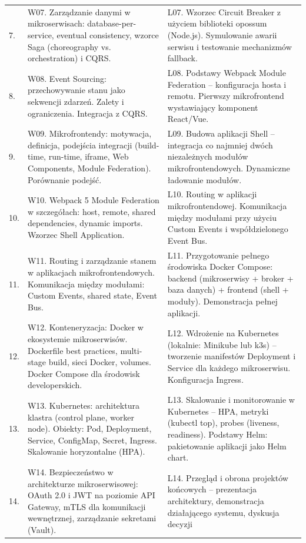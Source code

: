\documentclass[12pt, a4paper]{article}
\begin{document}
{\begin{longtable}{m{1.5cm}m{6.5cm}m{6.5cm}}
  \rowcolor{tableRowLight} 7. & W07. Zarządzanie danymi w mikroserwisach: database-per-service, eventual consistency, wzorce Saga (choreography vs. orchestration) i CQRS. & L07. Wzorzec Circuit Breaker z użyciem biblioteki opossum (Node.js). Symulowanie awarii serwisu i testowanie mechanizmów fallback. \\
  \rowcolor{tableRowAlt} 8. & W08. Event Sourcing: przechowywanie stanu jako sekwencji zdarzeń. Zalety i ograniczenia. Integracja z CQRS. & L08. Podstawy Webpack Module Federation – konfiguracja hosta i remotu. Pierwszy mikrofrontend wystawiający komponent React/Vue. \\
  \rowcolor{tableRowLight} 9. & W09. Mikrofrontendy: motywacja, definicja, podejścia integracji (build-time, run-time, iframe, Web Components, Module Federation). Porównanie podejść. & L09. Budowa aplikacji Shell – integracja co najmniej dwóch niezależnych modułów mikrofrontendowych. Dynamiczne ładowanie modułów. \\
  \rowcolor{tableRowAlt} 10. & W10. Webpack 5 Module Federation w szczegółach: host, remote, shared dependencies, dynamic imports. Wzorzec Shell Application. & L10. Routing w aplikacji mikrofrontendowej. Komunikacja między modułami przy użyciu Custom Events i współdzielonego Event Bus. \\
  \rowcolor{tableRowLight} 11. & W11. Routing i zarządzanie stanem w aplikacjach mikrofrontendowych. Komunikacja między modułami: Custom Events, shared state, Event Bus. & L11. Przygotowanie pełnego środowiska Docker Compose: backend (mikroserwisy + broker + baza danych) + frontend (shell + moduły). Demonstracja pełnej aplikacji. \\
  \rowcolor{tableRowAlt} 12. & W12. Konteneryzacja: Docker w ekosystemie mikroserwisów. Dockerfile best practices, multi-stage build, sieci Docker, volumes. Docker Compose dla środowisk developerskich. & L12. Wdrożenie na Kubernetes (lokalnie: Minikube lub k3s) – tworzenie manifestów Deployment i Service dla każdego mikroserwisu. Konfiguracja Ingress. \\
  \rowcolor{tableRowLight} 13. & W13. Kubernetes: architektura klastra (control plane, worker node). Obiekty: Pod, Deployment, Service, ConfigMap, Secret, Ingress. Skalowanie horyzontalne (HPA). & L13. Skalowanie i monitorowanie w Kubernetes – HPA, metryki (kubectl top), probes (liveness, readiness). Podstawy Helm: pakietowanie aplikacji jako Helm chart. \\
  \rowcolor{tableRowAlt} 14. & W14. Bezpieczeństwo w architekturze mikroserwisowej: OAuth 2.0 i JWT na poziomie API Gateway, mTLS dla komunikacji wewnętrznej, zarządzanie sekretami (Vault). & L14. Przegląd i obrona projektów końcowych – prezentacja architektury, demonstracja działającego systemu, dyskusja decyzji  \\

\end{longtable}}
\end{document}
